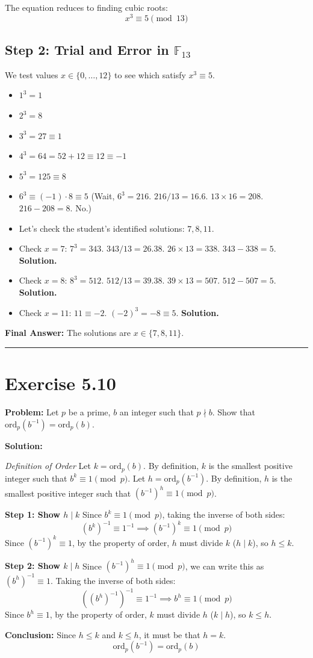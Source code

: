 The equation reduces to finding cubic roots:
$$ x^3 \equiv 5 \pmod{13} $$

\subsection*{Step 2: Trial and Error in $\mathbb{F}_{13}$}
We test values $x \in \{0, \dots, 12\}$ to see which satisfy $x^3 \equiv 5$.

\begin{itemize}
    \item $1^3 = 1$
    \item $2^3 = 8$
    \item $3^3 = 27 \equiv 1$
    \item $4^3 = 64 = 52 + 12 \equiv 12 \equiv -1$
    \item $5^3 = 125 \equiv 8$
    \item $6^3 \equiv (-1) \cdot 8 \equiv 5$ (Wait, $6^3 = 216$. $216 / 13 = 16.6$. $13 \times 16 = 208$. $216-208 = 8$. No.)
    \item Let's check the student's identified solutions: $7, 8, 11$.
    \item Check $x=7$: $7^3 = 343$. $343 / 13 = 26.38$. $26 \times 13 = 338$. $343 - 338 = 5$. \textbf{Solution.}
    \item Check $x=8$: $8^3 = 512$. $512 / 13 = 39.38$. $39 \times 13 = 507$. $512 - 507 = 5$. \textbf{Solution.}
    \item Check $x=11$: $11 \equiv -2$. $(-2)^3 = -8 \equiv 5$. \textbf{Solution.}
\end{itemize}

\textbf{Final Answer:}
The solutions are $x \in \{7, 8, 11\}$.

\hrule
\vspace{1cm}
\newpage
\section*{Exercise 5.10}
\textbf{Problem:} Let $p$ be a prime, $b$ an integer such that $p \nmid b$. Show that $\text{ord}_p(b^{-1}) = \text{ord}_p(b)$.

\textbf{Solution:}

\textit{Definition of Order}
Let $k = \text{ord}_p(b)$. By definition, $k$ is the smallest positive integer such that $b^k \equiv 1 \pmod p$.
Let $h = \text{ord}_p(b^{-1})$. By definition, $h$ is the smallest positive integer such that $(b^{-1})^h \equiv 1 \pmod p$.

\textbf{Step 1: Show $h \mid k$}
Since $b^k \equiv 1 \pmod p$, taking the inverse of both sides:
$$ (b^k)^{-1} \equiv 1^{-1} \implies (b^{-1})^k \equiv 1 \pmod p $$
Since $(b^{-1})^k \equiv 1$, by the property of order, $h$ must divide $k$ ($h \mid k$), so $h \le k$.

\textbf{Step 2: Show $k \mid h$}
Since $(b^{-1})^h \equiv 1 \pmod p$, we can write this as $(b^h)^{-1} \equiv 1$.
Taking the inverse of both sides:
$$ ((b^h)^{-1})^{-1} \equiv 1^{-1} \implies b^h \equiv 1 \pmod p $$
Since $b^h \equiv 1$, by the property of order, $k$ must divide $h$ ($k \mid h$), so $k \le h$.

\textbf{Conclusion:}
Since $h \le k$ and $k \le h$, it must be that $h = k$.
$$ \text{ord}_p(b^{-1}) = \text{ord}_p(b) $$